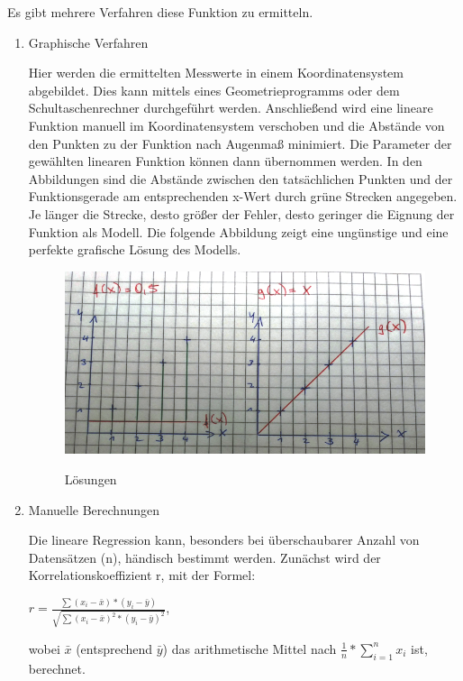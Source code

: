 Es gibt mehrere Verfahren diese Funktion zu ermitteln.

\begin{enumerate}
\item Graphische Verfahren

Hier werden die ermittelten Messwerte in einem Koordinatensystem abgebildet. Dies kann mittels eines Geometrieprogramms oder dem Schultaschenrechner durchgeführt werden. Anschließend wird eine lineare Funktion manuell im Koordinatensystem verschoben und die Abstände von den Punkten zu der Funktion nach Augenmaß minimiert. Die Parameter der gewählten linearen Funktion können dann übernommen werden. In den Abbildungen sind die Abstände zwischen den tatsächlichen Punkten und der Funktionsgerade am entsprechenden x-Wert durch grüne Strecken angegeben. Je länger die Strecke, desto größer der Fehler, desto geringer die Eignung der Funktion als Modell. Die folgende Abbildung zeigt eine ungünstige und eine perfekte grafische Lösung des Modells.

\begin{figure}[htbp]
\centering
\includegraphics[scale=.5]{Abbildungen/Lineare_Regression/GrafikVerfahren}
\label{Abb:Lösungen}
\caption{Lösungen}
\end{figure}


\item Manuelle Berechnungen

Die lineare Regression kann, besonders bei überschaubarer Anzahl von Datensätzen (n), händisch bestimmt werden. Zunächst wird der Korrelationskoeffizient r, mit der Formel:


$r= \frac{\sum (x_i-\bar{x})*(y_i-\bar{y})}{\sqrt{\sum (x_i-\bar{x})^{2}*(y_i-\bar{y})^{2}}}$,


wobei $\bar{x}$ (entsprechend $\bar{y}$) das arithmetische Mittel nach $\frac{1}{n}*\sum_{i=1}^{n} x_i$
ist, berechnet.




\end{enumerate}
